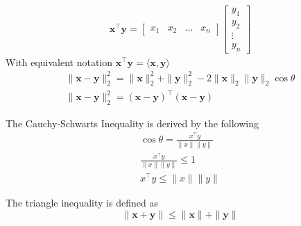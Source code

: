 \begin{align}
  \textbf{x}^\top \textbf{y} = 
  \begin{bmatrix}
     x_1 & x_2 & \dots & x_n
  \end{bmatrix}
  \begin{bmatrix}
    y_1 \\
     y_2 \\ 
     \vdots \\
     y_n
 \end{bmatrix}
\end{align}
With equivalent notation $\textbf{x}^\top \textbf{y} = \langle \textbf{x}, \textbf{y} \rangle$ \\
\begin{gather}
  \| \textbf{x} - \textbf{y} \|_2^2 = \| \textbf{x} \|_2^2 + \| \textbf{y} \|_2^2 - 2 \| \textbf{x} \|_2 \| \textbf{y} \|_2 \cos \theta \\
  \| \textbf{x} - \textbf{y} \|_2^2 = (\textbf{x} - \textbf{y})^\top (\textbf{x} - \textbf{y})
\end{gather}

The Cauchy-Schwarts Inequality is derived by the following
\begin{gather}
  \cos \theta = \frac{x^\top y}{\| x \| \| y \|} \\ 
  \frac{x^\top y}{\| x \| \| y \|} \leq 1 \\
  x^\top y \leq \| x \| \| y \|
\end{gather}

The triangle inequality is defined as
\begin{equation}
  \| \textbf{x} + \textbf{y} \| \leq \| \textbf{x} \| + \| \textbf{y} \|
\end{equation}

